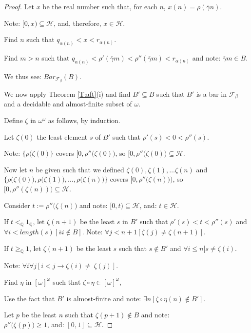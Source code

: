 \documentclass[a4paper]{amsart}
\theoremstyle{plain}
\begin{document}
\begin{proof}
 Let $x$ be the real number  such that, for each $n$, $x(n)=\rho(\overline \gamma n )$.  

Note:  $[0,x)\subseteq \mathcal{H}$, and, therefore, $x\in \mathcal{H}$.

Find $n$ such that $q_{\alpha(n)}<x<r_{\alpha(n)}$. 

Find $m>n$ such that $q_{\alpha(n)}<\rho'(\overline\gamma m)<\rho''(\overline\gamma m)<r_{\alpha(n)}$ and note: $\overline \gamma m \in  B$.

We thus see: $Bar_{\mathcal{F}_\beta}(B)$.


\smallskip We now  apply  Theorem \ref{T:aft}(i) and find $B'\subseteq B$ such that $B'$ is a bar in $\mathcal{F}_\beta$ and  a decidable and almost-finite subset of $\omega$.

Define $\zeta$ in $\omega^\omega$  as follows, by induction. 

Let $\zeta(0)$ the least element $s$ of $B'$ such that $\rho'(s) < 0 <\rho''(s)$. 

Note: $\{\rho\bigl(\zeta(0)\}$ covers $[0, \rho''\bigl(\zeta(0)\bigr)$, so $[0, \rho''\bigl(\zeta(0)\bigr)\subseteq \mathcal{H}$.

Now let $n$ be given such that we defined $\zeta(0), \zeta(1), \ldots \zeta(n)$ and \\$\{\rho\bigl(\zeta(0)\bigr), \rho\bigl(\zeta(1)\bigr), \ldots, \rho\bigl( \zeta(n)\bigr)\}$ covers $[0, \rho''\bigl(\zeta(n)\bigr))$, so $[0, \rho''(\zeta(n))\bigr)\subseteq \mathcal{H}$. 

Consider $t:=\rho''\bigl(\zeta(n) \bigr)$ and note: $[0,t)\subseteq \mathcal{H}$, and: $t\in \mathcal{H}$. 

If $t<_\mathbb{Q} 1_\mathbb{Q}$, let $\zeta(n+1)$ be the least $s$ in $B'$ such that $\rho'(s)< t< \rho''(s)$ and $\forall i<length(s)[\overline s i\notin B]$. Note: $\forall j<n+1[\zeta(j)\neq \zeta(n+1)]$. 

If $t\ge_\mathbb{Q} 1$, let $\zeta(n+1)$ be the least $s$ such that $s\notin B'$ and $\forall i\le n[s\neq \zeta(i)$. 

Note: $\forall i\forall j[i<j\rightarrow \zeta(i)\neq\ \zeta(j)]$.

Find $\eta$ in $[\omega]^\omega$ such that $\zeta\circ \eta \in [\omega]^\omega$,

Use the fact that $B'$ is almost-finite and note: $\exists n[\zeta\circ\eta(n)\notin B']$.

Let $p$ be the least $n$ such that $\zeta(p+1)\notin B$ and note:\\
$\rho''\bigl(\zeta(p)\bigr)\ge 1$, and: $[0,1]\subseteq \mathcal{H}$.
\end{proof}
 
\end{document}
